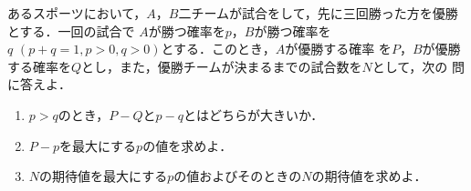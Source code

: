 \documentclass[a4j]{jarticle}
\begin{document}

     \begin{oframed}
     あるスポーツにおいて，$A$，$B$二チームが試合をして，先に三回勝った方を優勝とする．一回の試合で
     $A$が勝つ確率を$p$，$B$が勝つ確率を$q\,\, (p+q=1,p>0,q>0)$とする．このとき，$A$が優勝する確率
     を$P$，$B$が優勝する確率を$Q$とし，また，優勝チームが決まるまでの試合数を$N$として，次の
     問に答えよ．
           \begin{enumerate}[(1)]
           \item $p>q$のとき，$P-Q$と$p-q$とはどちらが大きいか．
           \item $P-p$を最大にする$p$の値を求めよ．
           \item $N$の期待値を最大にする$p$の値およびそのときの$N$の期待値を求めよ．
           \end{enumerate}
     \end{oframed}
\end{document}
